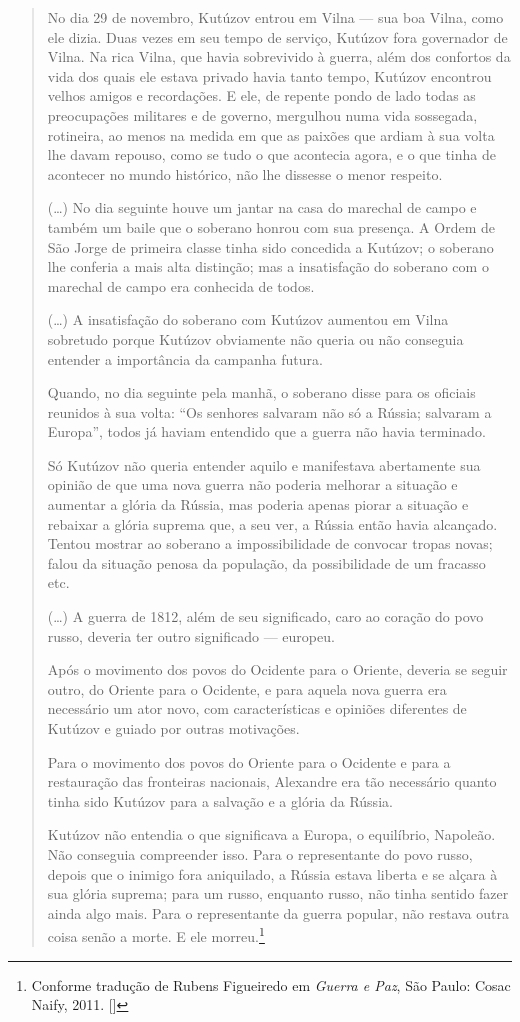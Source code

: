 \begin{quote}
No dia 29 de novembro, Kutúzov entrou em Vilna --- sua boa Vilna, como ele
dizia. Duas vezes em seu tempo de serviço, Kutúzov fora governador de
Vilna. Na rica Vilna, que havia sobrevivido à guerra, além dos confortos
da vida dos quais ele estava privado havia tanto tempo, Kutúzov
encontrou velhos amigos e recordações. E ele, de repente pondo de lado
todas as preocupações militares e de governo, mergulhou numa vida
sossegada, rotineira, ao menos na medida em que as paixões que ardiam à
sua volta lhe davam repouso, como se tudo o que acontecia agora, e o que
tinha de acontecer no mundo histórico, não lhe dissesse o menor
respeito.

(\ldots{}) No dia seguinte houve um jantar na casa do marechal de campo e
também um baile que o soberano honrou com sua presença. A Ordem de São
Jorge de primeira classe tinha sido concedida a Kutúzov; o soberano lhe
conferia a mais alta distinção; mas a insatisfação do soberano com o
marechal de campo era conhecida de todos.

(\ldots{}) A insatisfação do soberano com Kutúzov aumentou em Vilna sobretudo
porque Kutúzov obviamente não queria ou não conseguia entender a
importância da campanha futura.

Quando, no dia seguinte pela manhã, o soberano disse para os oficiais
reunidos à sua volta: ``Os senhores salvaram não só a Rússia; salvaram a
Europa'', todos já haviam entendido que a guerra não havia terminado.

Só Kutúzov não queria entender aquilo e manifestava abertamente sua
opinião de que uma nova guerra não poderia melhorar a situação e
aumentar a glória da Rússia, mas poderia apenas piorar a situação e
rebaixar a glória suprema que, a seu ver, a Rússia então havia
alcançado. Tentou mostrar ao soberano a impossibilidade de convocar
tropas novas; falou da situação penosa da população, da possibilidade de
um fracasso etc.

(\ldots{}) A guerra de 1812, além de seu significado, caro ao coração do povo
russo, deveria ter outro significado --- europeu.

Após o movimento dos povos do Ocidente para o Oriente, deveria se seguir
outro, do Oriente para o Ocidente, e para aquela nova guerra era
necessário um ator novo, com características e opiniões diferentes de
Kutúzov e guiado por outras motivações.

Para o movimento dos povos do Oriente para o Ocidente e para a
restauração das fronteiras nacionais, Alexandre  era tão necessário
quanto tinha sido Kutúzov para a salvação e a glória da Rússia.

Kutúzov não entendia o que significava a Europa, o equilíbrio, Napoleão.
Não conseguia compreender isso. Para o representante do povo russo,
depois que o inimigo fora aniquilado, a Rússia estava liberta e se
alçara à sua glória suprema; para um russo, enquanto russo, não tinha
sentido fazer ainda algo mais. Para o representante da guerra popular,
não restava outra coisa senão a morte. E ele morreu.\footnote{Conforme tradução de Rubens Figueiredo em \emph{Guerra e Paz}, São Paulo: Cosac Naify, 2011. []}
\end{quote}

